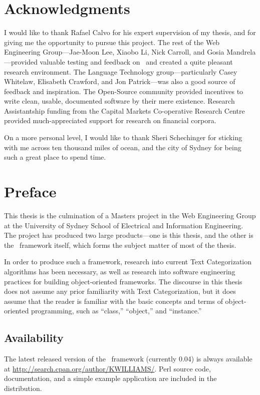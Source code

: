 \chapter{Acknowledgments}

I would like to thank Rafael Calvo for his expert supervision of my
thesis, and for giving me the opportunity to pursue this project.  The
rest of the Web Engineering Group---Jae-Moon Lee, Xiaobo Li, Nick
Carroll, and Gosia Mandrela---provided valuable testing and feedback
on \aicat\ and created a quite pleasant research environment.  The
Language Technology group---particularly Casey Whitelaw, Elisabeth
Crawford, and Jon Patrick---was also a good source of feedback and
inspiration.  The Open-Source community provided incentives to write
clean, usable, documented software by their mere existence.  Research
Assistantship funding from the Capital Markets Co-operative Research
Centre provided much-appreciated support for research on financial
corpora.

On a more personal level, I would like to thank Sheri Schechinger for sticking
with me across ten thousand miles of ocean, and the city of Sydney for
being such a great place to spend time.

\chapter{Preface}

This thesis is the culmination of a Masters project in the Web
Engineering Group at the University of Sydney School of Electrical and
Information Engineering.  The project has produced two large
products---one is this thesis, and the other is the \aicat\ framework
itself, which forms the subject matter of most of the thesis.

In order to produce such a framework, research into current Text
Categorization algorithms has been necessary, as well as research into
software engineering practices for building object-oriented
frameworks.  The discourse in this thesis does not assume any prior
familiarity with Text Categorization, but it does assume that the
reader is familiar with the basic concepts and terms of
object-oriented programming, such as ``class,'' ``object,'' and
``instance.''


\section*{Availability}

The latest released version of the \aicat\ framework (currently 0.04)
is always available at
\url{http://search.cpan.org/author/KWILLIAMS/}.  Perl source code,
documentation, and a simple example application are included in the
distribution.

